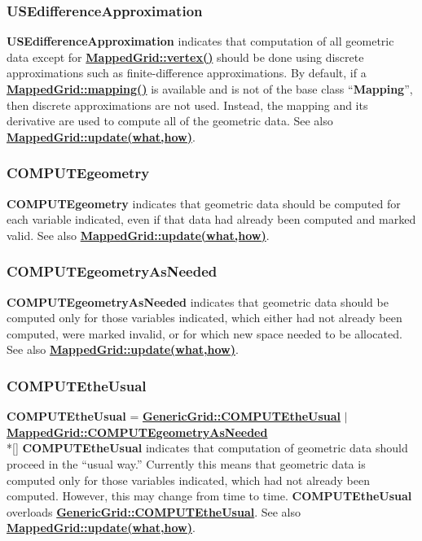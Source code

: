 \documentclass{article}
\begin{document}
  \subsubsection{USEdifferenceApproximation}
  \label{MappedGrid::USEdifferenceApproximation}
    \textbf{USEdifferenceApproximation} indicates that computation of all geometric data except for
    {\bf{}\hyperref{vertex()}{vertex() \rm(\S}{)}{MappedGrid::vertex()}}
    should be done using discrete approximations such as finite-difference approximations.
    By default, if a {\bf{}\hyperref{mapping}{mapping \rm(\S}{)}{MappedGrid::mapping()}} is available
    and is not of the base class ``\textbf{Mapping}'', then discrete approximations are not used.
    Instead, the mapping and its derivative are used to compute all of the geometric data.
    See also {\bf{}\hyperref{update(what,how)}{update(what,how) \rm(\S}{)}{MappedGrid::update(what,how)}}.

  \subsubsection{COMPUTEgeometry}
  \label{MappedGrid::COMPUTEgeometry}
    \textbf{COMPUTEgeometry} indicates that geometric data should be computed for each variable indicated,
    even if that data had already been computed and marked valid.
    See also {\bf{}\hyperref{update(what,how)}{update(what,how) \rm(\S}{)}{MappedGrid::update(what,how)}}.

  \subsubsection{COMPUTEgeometryAsNeeded}
  \label{MappedGrid::COMPUTEgeometryAsNeeded}
    \textbf{COMPUTEgeometryAsNeeded} indicates that geometric data should be computed only for those variables indicated,
    which either had not already been computed, were marked invalid, or for which
    new space needed to be allocated.
    See also {\bf{}\hyperref{update(what,how)}{update(what,how) \rm(\S}{)}{MappedGrid::update(what,how)}}.

  \subsubsection{COMPUTEtheUsual}
  \label{MappedGrid::COMPUTEtheUsual}
    \textbf{COMPUTEtheUsual}
    =       {\bf{}\hyperref{GenericGrid::COMPUTEtheUsual}{GenericGrid::COMPUTEtheUsual \rm(\S}{)}{GenericGrid::COMPUTEtheUsual}}
    $\mid$  {\bf{}\hyperref{COMPUTEgeometryAsNeeded}{COMPUTEgeometryAsNeeded \rm(\S}{)}{MappedGrid::COMPUTEgeometryAsNeeded}} \\*[\parskip]
    \textbf{COMPUTEtheUsual} indicates that computation of geometric data should proceed in the ``usual way.''
    Currently this means that geometric data is computed only for those variables indicated,
    which had not already been computed.  However, this may change from time to time.
    \textbf{COMPUTEtheUsual} overloads
    {\bf{}\hyperref{GenericGrid::COMPUTEtheUsual}{GenericGrid::COMPUTEtheUsual \rm(\S}{)}{GenericGrid::COMPUTEtheUsual}}.
    See also {\bf{}\hyperref{update(what,how)}{update(what,how) \rm(\S}{)}{MappedGrid::update(what,how)}}.
\end{document}
